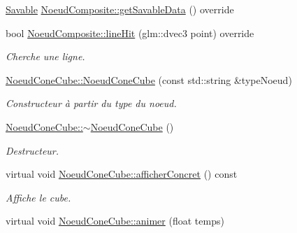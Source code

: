 \begin{DoxyCompactItemize}
\item 
\hyperlink{class_savable}{Savable} \hyperlink{group__inf2990_ga3fefd2b70f384f82cb6319f468c01a63}{Noeud\-Composite\-::get\-Savable\-Data} () override
\item 
bool \hyperlink{group__inf2990_gaf1aff36b4974423ea872caedd0d5b129}{Noeud\-Composite\-::line\-Hit} (glm\-::dvec3 point) override
\begin{DoxyCompactList}\small\item\em Cherche une ligne. \end{DoxyCompactList}\item 
\hyperlink{group__inf2990_ga6f0bcd8b494e8aa6f3a8dad78bad2c0f}{Noeud\-Cone\-Cube\-::\-Noeud\-Cone\-Cube} (const std\-::string \&type\-Noeud)
\begin{DoxyCompactList}\small\item\em Constructeur à partir du type du noeud. \end{DoxyCompactList}\item 
\hyperlink{group__inf2990_ga8db4b36c3469001f7dcfab23debe7d2f}{Noeud\-Cone\-Cube\-::$\sim$\-Noeud\-Cone\-Cube} ()
\begin{DoxyCompactList}\small\item\em Destructeur. \end{DoxyCompactList}\item 
virtual void \hyperlink{group__inf2990_ga4b1f68c409f0b1c5eabd0be7822a36d2}{Noeud\-Cone\-Cube\-::afficher\-Concret} () const 
\begin{DoxyCompactList}\small\item\em Affiche le cube. \end{DoxyCompactList}\item 
\hypertarget{group__inf2990_ga3472a200d45ce3cdff72d72921807b21}{virtual void \hyperlink{group__inf2990_ga3472a200d45ce3cdff72d72921807b21}{Noeud\-Cone\-Cube\-::animer} (float temps)}\label{group__inf2990_ga3472a200d45ce3cdff72d72921807b21}


\end{DoxyCompactItemize}
